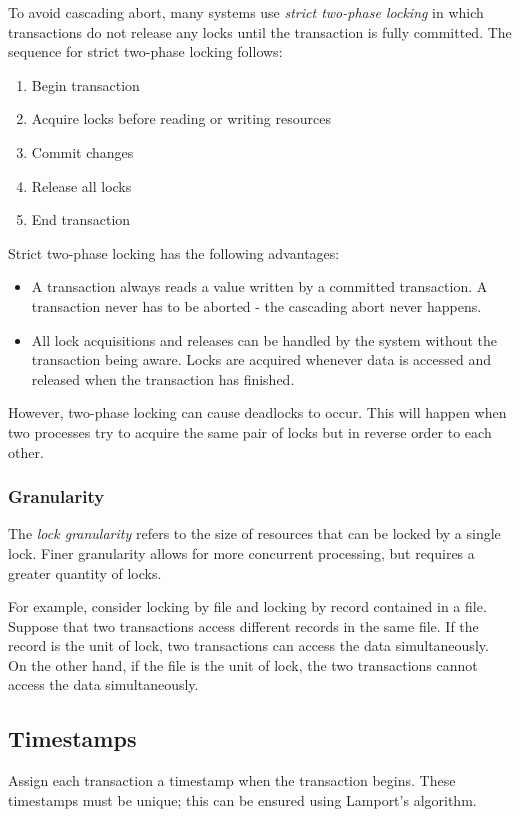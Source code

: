 To avoid cascading abort, many systems use \textit{strict two-phase locking} in which transactions do not release any locks until the transaction is fully committed. The sequence for strict two-phase locking follows: \begin{enumerate}
\item Begin transaction
\item Acquire locks before reading or writing resources
\item Commit changes
\item Release all locks
\item End transaction
\end{enumerate}

Strict two-phase locking has the following advantages: \begin{itemize}
\item A transaction always reads a value written by a committed transaction. A transaction never has to be aborted - the cascading abort never happens. 
\item All lock acquisitions and releases can be handled by the system without the transaction being aware. Locks are acquired whenever data is accessed and released when the transaction has finished. 
\end{itemize}

However, two-phase locking can cause deadlocks to occur. This will happen when two processes try to acquire the same pair of locks but in reverse order to each other.

\subsubsection{Granularity}
The \textit{lock granularity} refers to the size of resources that can be locked by a single lock. Finer granularity allows for more concurrent processing, but requires a greater quantity of locks.

For example, consider locking by file and locking by record contained in a file. Suppose that two transactions access different records in the same file. If the record is the unit of lock, two transactions can access the data simultaneously. On the other hand, if the file is the unit of lock, the two transactions cannot access the data simultaneously. 

\subsection{Timestamps}
Assign each transaction a timestamp when the transaction begins. These timestamps must be unique; this can be ensured using 
Lamport's algorithm. 

